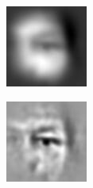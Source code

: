 \documentclass{article}
\begin{document}
\begin{figure}[h!]
\begin{subfigure}[b]{0.1\textwidth}
    \end{subfigure}
    \hspace{-1\baselineskip}
    \quad
    \begin{subfigure}[b]{0.1\textwidth}   
        \centering 
        \includegraphics[width=\textwidth]{plots/D_log_R2_template.jpg}

    \end{subfigure}
    \hspace{-1\baselineskip}
    \quad
    \begin{subfigure}[b]{0.1\textwidth}   
        \centering 
        \includegraphics[width=\textwidth]{plots/E_log_R2_template.jpg}


\end{subfigure}
\end{figure}
\end{document}
